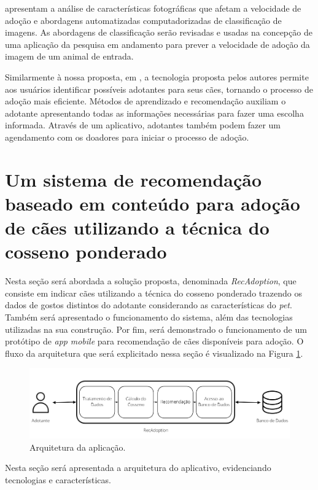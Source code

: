 \documentclass[portuguese]{textolivre}
\begin{document}
\textcite{10.1145/3384613.3384656} apresentam a análise de características fotográficas que afetam a velocidade de adoção e abordagens automatizadas computadorizadas de classificação de imagens. As abordagens de classificação serão revisadas e usadas na concepção de uma aplicação da pesquisa em andamento para prever a velocidade de adoção da imagem de um animal de entrada. 

Similarmente à nossa proposta, em \textcite{aipet}, a tecnologia proposta pelos autores permite aos usuários identificar possíveis adotantes para seus cães, tornando o processo de adoção mais eficiente. Métodos de aprendizado e recomendação auxiliam o adotante apresentando todas as informações necessárias para fazer uma escolha informada. Através de um aplicativo, adotantes também podem fazer um agendamento com os doadores para iniciar o processo de adoção.


\section{Um sistema de recomendação baseado em conteúdo para adoção de cães utilizando a técnica do cosseno ponderado} \label{cap:recsysadocao}


Nesta seção será abordada a solução proposta, denominada \textit{RecAdoption}, que consiste em indicar cães utilizando a técnica do cosseno ponderado trazendo os dados de gostos distintos do adotante considerando as características do  \textit{pet}. Também será apresentado o funcionamento do sistema, além das tecnologias utilizadas na sua construção. Por fim, será demonstrado o funcionamento de um protótipo de \textit{app} \textit{mobile} para recomendação de cães disponíveis para adoção. O fluxo da arquitetura que será explicitado nessa seção é visualizado na Figura \ref{fig:009}.

\begin{figure}[H]
\centering
\includegraphics[scale=0.55]{imagens/fig-009.png}
\caption{Arquitetura da aplicação.}
\label{fig:009}
\end{figure}

Nesta seção será apresentada a arquitetura do aplicativo, evidenciando tecnologias e características.
\end{document}
